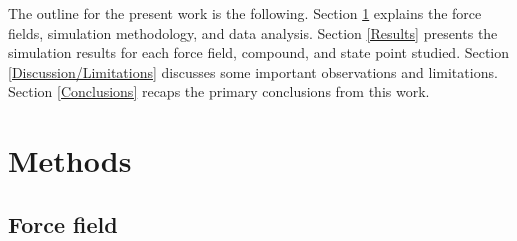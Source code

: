 \documentclass[preprint,review,12pt]{elsarticle}
\begin{document}
    The outline for the present work is the following. Section \ref{Methods} explains the force fields, simulation methodology, and data analysis. Section \ref{Results} presents the simulation results for each force field, compound, and state point studied. Section \ref{Discussion/Limitations} discusses some important observations and limitations. Section \ref{Conclusions} recaps the primary conclusions from this work.
    
	
	
	\section{Methods} \label{Methods}
	
	\subsection{Force field} \label{Force Field}
	
\end{document}

